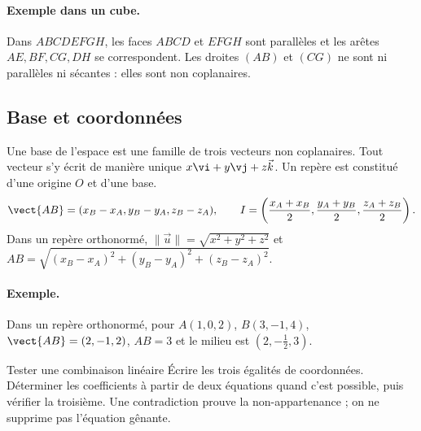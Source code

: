 \paragraph{Exemple dans un cube.} Dans $ABCDEFGH$, les faces $ABCD$ et $EFGH$ sont parallèles et les arêtes $AE,BF,CG,DH$ se correspondent. Les droites $(AB)$ et $(CG)$ ne sont ni parallèles ni sécantes : elles sont non coplanaires.
\subsection{Base et coordonnées}
Une base de l'espace est une famille de trois vecteurs non coplanaires. Tout vecteur s'y écrit de manière unique $x\vi +y\vj +z\vec k$. Un repère est constitué d'une origine $O$ et d'une base.
\[\vect{AB}=(x_B-x_A,y_B-y_A,z_B-z_A),\qquad
I=\left(\frac{x_A+x_B}2,\frac{y_A+y_B}2,\frac{z_A+z_B}2\right).\]
Dans un repère orthonormé, $\|\vec u\|=\sqrt{x^2+y^2+z^2}$ et $AB=\sqrt{(x_B-x_A)^2+(y_B-y_A)^2+(z_B-z_A)^2}$.
\paragraph{Exemple.} Dans un repère orthonormé, pour $A(1,0,2)$, $B(3,-1,4)$, $\vect{AB}=(2,-1,2)$, $AB=3$ et le milieu est $(2,-\frac{1}{2},3)$.
\begin{methode}{Tester une combinaison linéaire}
Écrire les trois égalités de coordonnées. Déterminer les coefficients à partir de deux équations quand c'est possible, puis vérifier la troisième. Une contradiction prouve la non-appartenance ; on ne supprime pas l'équation gênante.
\end{methode}



